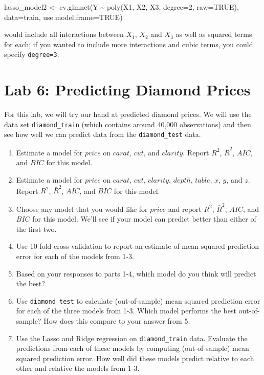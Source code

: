 \documentclass[
  letterpaper,
  DIV=11,
  numbers=noendperiod]{scrreprt}
\newenvironment{Shaded}{\begin{snugshade}}{\end{snugshade}}
\newcommand{\AttributeTok}[1]{\textcolor[rgb]{0.40,0.45,0.13}{#1}}
\newcommand{\ConstantTok}[1]{\textcolor[rgb]{0.56,0.35,0.01}{#1}}
\newcommand{\DecValTok}[1]{\textcolor[rgb]{0.68,0.00,0.00}{#1}}
\newcommand{\FunctionTok}[1]{\textcolor[rgb]{0.28,0.35,0.67}{#1}}
\newcommand{\NormalTok}[1]{\textcolor[rgb]{0.00,0.23,0.31}{#1}}
\newcommand{\OtherTok}[1]{\textcolor[rgb]{0.00,0.23,0.31}{#1}}
\newcommand{\SpecialCharTok}[1]{\textcolor[rgb]{0.37,0.37,0.37}{#1}}
\begin{document}
\begin{Shaded}
\begin{Highlighting}[]
\NormalTok{lasso\_model2 }\OtherTok{\textless{}{-}} \FunctionTok{cv.glmnet}\NormalTok{(Y }\SpecialCharTok{\textasciitilde{}} \FunctionTok{poly}\NormalTok{(X1, X2, X3, }\AttributeTok{degree=}\DecValTok{2}\NormalTok{, }\AttributeTok{raw=}\ConstantTok{TRUE}\NormalTok{), }
                          \AttributeTok{data=}\NormalTok{train, }
                          \AttributeTok{use.model.frame=}\ConstantTok{TRUE}\NormalTok{)}
\end{Highlighting}
\end{Shaded}

would include all interactions between \(X_1\), \(X_2\) and \(X_3\) as
well as squared terms for each; if you wanted to include more
interactions and cubic terms, you could specify \texttt{degree=3}.

\section{Lab 6: Predicting Diamond
Prices}\label{lab-6-predicting-diamond-prices}

For this lab, we will try our hand at predicted diamond prices. We will
use the data set \texttt{diamond\_train} (which contains around 40,000
observations) and then see how well we can predict data from the
\texttt{diamond\_test} data.

\begin{enumerate}
\def\labelenumi{\arabic{enumi}.}
\item
  Estimate a model for \(price\) on \(carat\), \(cut\), and \(clarity\).
  Report \(R^2\), \(\bar{R}^2\), \(AIC\), and \(BIC\) for this model.
\item
  Estimate a model for \(price\) on \(carat\), \(cut\), \(clarity\),
  \(depth\), \(table\), \(x\), \(y\), and \(z\). Report \(R^2\),
  \(\bar{R}^2\), \(AIC\), and \(BIC\) for this model.
\item
  Choose any model that you would like for \(price\) and report \(R^2\),
  \(\bar{R}^2\), \(AIC\), and \(BIC\) for this model. We'll see if your
  model can predict better than either of the first two.
\item
  Use 10-fold cross validation to report an estimate of mean squared
  prediction error for each of the models from 1-3.
\item
  Based on your responses to parts 1-4, which model do you think will
  predict the best?
\item
  Use \texttt{diamond\_test} to calculate (out-of-sample) mean squared
  prediction error for each of the three models from 1-3. Which model
  performs the best out-of-sample? How does this compare to your answer
  from 5.
\item
  Use the Lasso and Ridge regression on \texttt{diamond\_train} data.
  Evaluate the predictions from each of these models by computing
  (out-of-sample) mean squared prediction error. How well did these
  models predict relative to each other and relative the models from
  1-3.
\end{enumerate}
\end{document}
